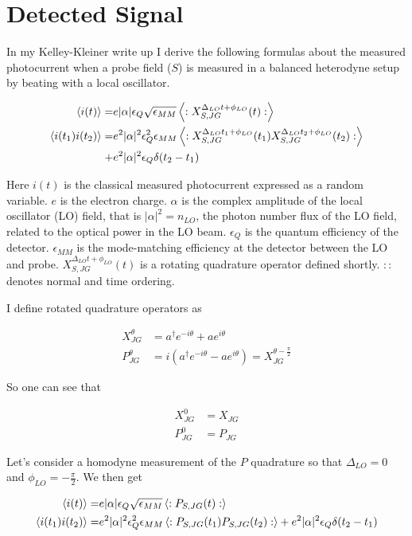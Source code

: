 \documentclass[12pt]{article}
\begin{document}
\section{Detected Signal}
In my Kelley-Kleiner write up I derive the following formulas about the measured photocurrent when a probe field ($S$) is measured in a balanced heterodyne setup by beating with a local oscillator.

\begin{align}
\Braket{i(t)} = &e |\alpha| \epsilon_Q \sqrt{\epsilon_{MM}} \Braket{:X_{S, JG}^{\Delta_{LO}t + \phi_{LO}}(t):}\\
\Braket{i(t_1)i(t_2)} = &e^2|\alpha|^2 \epsilon_Q^2 \epsilon_{MM} \Braket{:X_{S, JG}^{\Delta_{LO}t_1+\phi_{LO}}(t_1)X_{S, JG}^{\Delta_{LO}t_2 + \phi_{LO}}(t_2):}\\
+ &e^2|\alpha|^2\epsilon_Q \delta(t_2-t_1)
\end{align}

Here $i(t)$ is the classical measured photocurrent expressed as a random variable. $e$ is the electron charge. $\alpha$ is the complex amplitude of the local oscillator (LO) field, that is $|\alpha|^2=n_{LO}$, the photon number flux of the LO field, related to the optical power in the LO beam. $\epsilon_Q$ is the quantum efficiency of the detector. $\epsilon_{MM}$ is the mode-matching efficiency at the detector between the LO and probe. $X_{S, JG}^{\Delta_{LO} t + \phi_{LO}}(t)$ is a rotating quadrature operator defined shortly. $::$ denotes normal and time ordering.

I define rotated quadrature operators as

\begin{align}
X^{\theta}_{JG} &= a^{\dag}e^{-i\theta} + a e^{i\theta}\\
P^{\theta}_{JG} &= i(a^{\dag}e^{-i\theta} - a e^{i \theta}) = X^{\theta-\frac{\pi}{2}}_{JG}
\end{align}

So one can see that

\begin{align}
X^0_{JG} &= X_{JG}\\
P^0_{JG} &= P_{JG}
\end{align}

Let's consider a homodyne measurement of the $P$ quadrature so that $\Delta_{LO} = 0$ and $\phi_{LO} = -\frac{\pi}{2}$. We then get

\begin{align}
\braket{i(t)} = &e |\alpha|\epsilon_Q \sqrt{\epsilon_{MM}}\Braket{:P_{S,JG}(t):}\\
\braket{i(t_1)i(t_2)} = &e^2|\alpha|^2\epsilon_Q^2\epsilon_{MM}\Braket{:P_{S,JG}(t_1)P_{S,JG}(t_2):} + e^2|\alpha|^2\epsilon_Q\delta(t_2-t_1)
\end{align}
\end{document}
